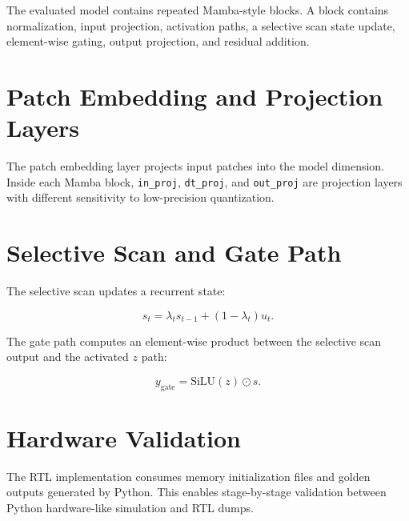 The evaluated model contains repeated Mamba-style blocks. A block contains normalization, input projection, activation paths, a selective scan state update, element-wise gating, output projection, and residual addition.

\section{Patch Embedding and Projection Layers}

The patch embedding layer projects input patches into the model dimension. Inside each Mamba block, \texttt{in\_proj}, \texttt{dt\_proj}, and \texttt{out\_proj} are projection layers with different sensitivity to low-precision quantization.

\section{Selective Scan and Gate Path}

The selective scan updates a recurrent state:

\begin{equation}
  s_t = \lambda_t s_{t-1} + (1 - \lambda_t) u_t.
\end{equation}

The gate path computes an element-wise product between the selective scan output and the activated $z$ path:

\begin{equation}
  y_{\mathrm{gate}} = \mathrm{SiLU}(z) \odot s.
\end{equation}

\section{Hardware Validation}

The RTL implementation consumes memory initialization files and golden outputs generated by Python. This enables stage-by-stage validation between Python hardware-like simulation and RTL dumps.

